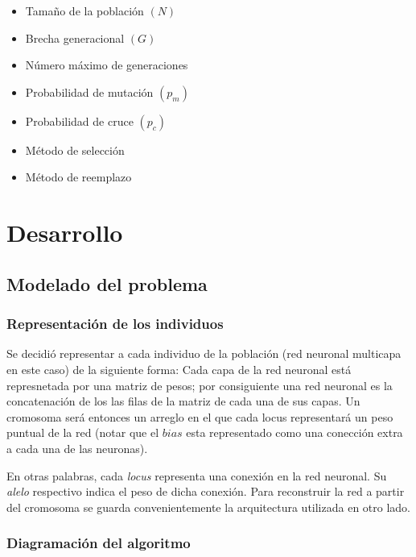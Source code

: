 \documentclass[%
    final,
    reprint,
    notitlepage,
    narroweqnarray,
    inline,
    twoside,
    invited
    ]{ieee}
\begin{document}
\begin{itemize} 
\item Tamaño de la población $(N)$
\item Brecha generacional $(G)$
\item Número máximo de generaciones
\item Probabilidad de mutación $(p_m)$
\item Probabilidad de cruce $(p_c)$
\item Método de selección
\item Método de reemplazo
\end{itemize} 



\section{Desarrollo}

\subsection{Modelado del problema}

\subsubsection{Representación de los individuos}

\par Se decidió representar a cada individuo de la población (red neuronal multicapa en este caso) de la siguiente forma: Cada capa de la red neuronal está represnetada por una matriz de pesos; por consiguiente una red neuronal es la concatenación de los las filas de la matriz de cada una de sus capas. Un cromosoma será entonces un arreglo en el que cada locus representará un peso puntual de la red (notar que el $bias$ esta representado como una conección extra a cada una de las neuronas).
\par En otras palabras, cada \textit{locus} representa una conexión en la red neuronal. Su \textit{alelo} respectivo 
indica el peso de dicha conexión. Para reconstruir la red a partir del cromosoma se guarda convenientemente la 
arquitectura utilizada en otro lado.

\subsubsection{Diagramación del algoritmo}
\end{document}
